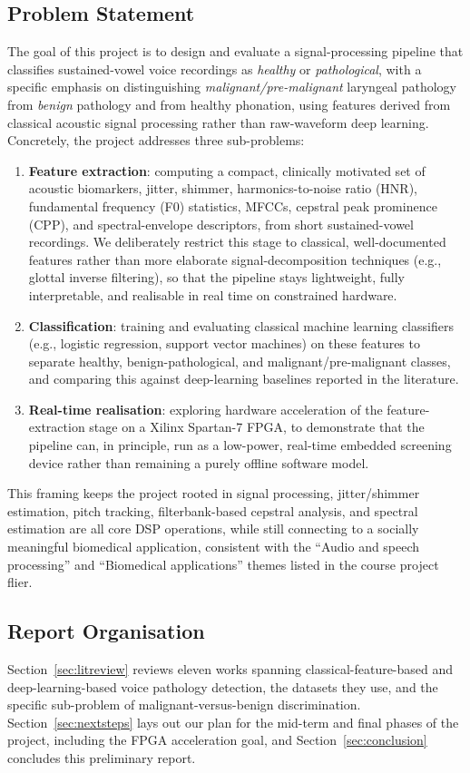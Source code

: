\documentclass[conference]{IEEEtran}
\begin{document}
\subsection{Problem Statement}
The goal of this project is to design and evaluate a signal-processing pipeline that classifies sustained-vowel voice recordings as \emph{healthy} or \emph{pathological}, with a specific emphasis on distinguishing \emph{malignant/pre-malignant} laryngeal pathology from \emph{benign} pathology and from healthy phonation, using features derived from classical acoustic signal processing rather than raw-waveform deep learning. Concretely, the project addresses three sub-problems:
\begin{enumerate}
    \item \textbf{Feature extraction}: computing a compact, clinically motivated set of acoustic biomarkers, jitter, shimmer, harmonics-to-noise ratio (HNR), fundamental frequency (F0) statistics, MFCCs, cepstral peak prominence (CPP), and spectral-envelope descriptors, from short sustained-vowel recordings. We deliberately restrict this stage to classical, well-documented features rather than more elaborate signal-decomposition techniques (e.g., glottal inverse filtering), so that the pipeline stays lightweight, fully interpretable, and realisable in real time on constrained hardware.
    \item \textbf{Classification}: training and evaluating classical machine learning classifiers (e.g., logistic regression, support vector machines) on these features to separate healthy, benign-pathological, and malignant/pre-malignant classes, and comparing this against deep-learning baselines reported in the literature.
    \item \textbf{Real-time realisation}: exploring hardware acceleration of the feature-extraction stage on a Xilinx Spartan-7 FPGA, to demonstrate that the pipeline can, in principle, run as a low-power, real-time embedded screening device rather than remaining a purely offline software model.
\end{enumerate}

This framing keeps the project rooted in signal processing, jitter/shimmer estimation, pitch tracking, filterbank-based cepstral analysis, and spectral estimation are all core DSP operations, while still connecting to a socially meaningful biomedical application, consistent with the ``Audio and speech processing'' and ``Biomedical applications'' themes listed in the course project flier.

\subsection{Report Organisation}
Section~\ref{sec:litreview} reviews eleven works spanning classical-feature-based and deep-learning-based voice pathology detection, the datasets they use, and the specific sub-problem of malignant-versus-benign discrimination. Section~\ref{sec:nextsteps} lays out our plan for the mid-term and final phases of the project, including the FPGA acceleration goal, and Section~\ref{sec:conclusion} concludes this preliminary report.
\end{document}
